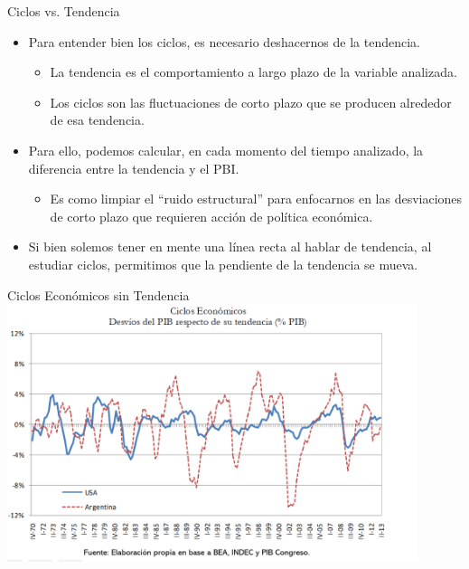 \documentclass{beamer}
\begin{document}
\begin{frame}{Ciclos vs. Tendencia}
    \begin{itemize}
        \item Para entender bien los ciclos, es necesario deshacernos de la tendencia. 
            \begin{itemize}
            \item La tendencia es el comportamiento a largo plazo de la variable analizada.
            \item Los ciclos son las fluctuaciones de corto plazo que se producen alrededor de esa tendencia.
            \end{itemize} \vspace{1mm}
        \item Para ello, podemos calcular, en cada momento del tiempo analizado, la diferencia entre la tendencia y el PBI. 
        \begin{itemize}
            \item Es como limpiar el “ruido estructural” para enfocarnos en las desviaciones de corto plazo que requieren acción de política económica.
            \end{itemize} \vspace{1mm}
        \item Si bien solemos tener en mente una línea recta al hablar de tendencia, al estudiar ciclos, permitimos que la pendiente de la tendencia se mueva. 
    \end{itemize}
\end{frame}

\begin{frame}{Ciclos Económicos sin Tendencia}
\centering
\includegraphics[width=12cm]{../Figures/P12.png}\
\end{frame}
\end{document}
